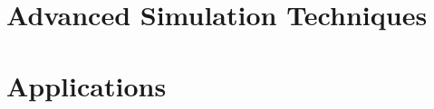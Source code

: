 \documentclass[fleqn,10pt,a4paper,openright, draft]{book}
\begin{document}
\part{Advanced Simulation Techniques}





\part{Applications}




\appendix




 











\printindex

\pagestyle{empty}


\cleardoublepage

\end{document}
